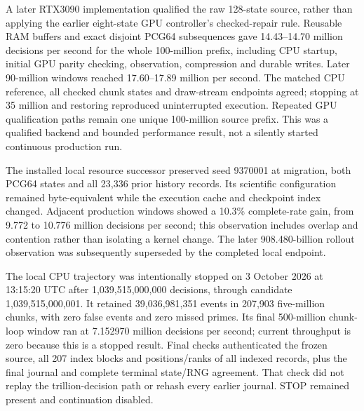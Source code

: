 A later RTX3090 implementation qualified the raw 128-state source, rather than applying the earlier eight-state GPU controller's checked-repair rule. Reusable RAM buffers and exact disjoint PCG64 subsequences gave 14.43--14.70 million decisions per second for the whole 100-million prefix, including CPU startup, initial GPU parity checking, observation, compression and durable writes. Later 90-million windows reached 17.60--17.89 million per second. The matched CPU reference, all checked chunk states and draw-stream endpoints agreed; stopping at 35 million and restoring reproduced uninterrupted execution. Repeated GPU qualification paths remain one unique 100-million source prefix. This was a qualified backend and bounded performance result, not a silently started continuous production run.

The installed local resource successor preserved seed 9370001 at migration, both PCG64 states and all 23,336 prior history records. Its scientific configuration remained byte-equivalent while the execution cache and checkpoint index changed. Adjacent production windows showed a 10.3\% complete-rate gain, from 9.772 to 10.776 million decisions per second; this observation includes overlap and contention rather than isolating a kernel change. The later 908.480-billion rollout observation was subsequently superseded by the completed local endpoint.

The local CPU trajectory was intentionally stopped on 3 October 2026 at 13:15:20 UTC after 1,039,515,000,000 decisions, through candidate 1,039,515,000,001. It retained 39,036,981,351 events in 207,903 five-million chunks, with zero false events and zero missed primes. Its final 500-million chunk-loop window ran at 7.152970 million decisions per second; current throughput is zero because this is a stopped result. Final checks authenticated the frozen source, all 207 index blocks and positions/ranks of all indexed records, plus the final journal and complete terminal state/RNG agreement. That check did not replay the trillion-decision path or rehash every earlier journal. STOP remained present and continuation disabled.

